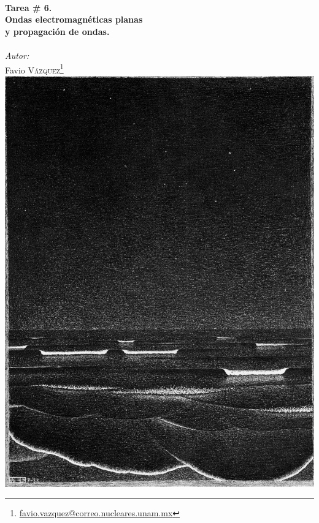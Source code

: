 \documentclass[a4paper,11pt]{article}
\numberwithin{equation}{section}
\begin{document}
\begin{titlepage}

\HRule \\[0.1cm]
{ \huge \bfseries Tarea \# 6. \\ Ondas electromagnéticas planas \\
y propagación de ondas.}\\ %
\HRule \\[0.1cm]
 
\setcounter{footnote}{0}
\center
\large
\emph{Autor:} \\ %
\Large Favio \textsc{Vázquez}\footnote[1]{\href{mailto:favio.vazquez@correo.nucleares.unam.mx}{favio.vazquez@correo.nucleares.unam.mx}}
\\[0.7cm]

\includegraphics[scale=1.2]{escherOndas}


\vfill %

\end{titlepage}
\end{document}
